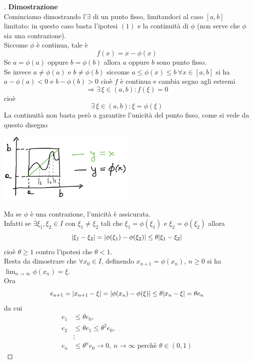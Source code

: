 \begin{proof}[\unskip\nopunct]
\textbf{Dimostrazione}\\
Cominciamo dimostrando l'$\exists$ di un punto fisso, limitandoci al caso $[a,b]$ limitato: in questo caso basta l'ipotesi $(1)$ e la continuità di $\phi$ (non serve che $\phi$ sia una contrazione). \\
Siccome $\phi$ è continua, tale è 
\[ f(x) = x - \phi(x) \]
Se $a = \phi(a)$ oppure $b = \phi(b)$ allora $a$ oppure $b$ sono punto fisso.\\
Se invece $a \neq \phi(a)$ e $b \neq \phi(b)$ siccome $a \leq \phi(x) \leq b \ \forall x \in [a,b]$ si ha $a - \phi(a) < 0$ e $b - \phi(b) > 0$ cioè $f$ è continua e cambia segno agli estremi 
\[\Longrightarrow \exists\, \xi \in (a,b):f(\xi)=0\] 
cioè \[\exists\, \xi \in (a,b) : \xi = \phi(\xi)\]
La continuità non basta però a garantire l'unicità del punto fisso, come si vede da questo disegno
\begin{center}
    \includegraphics[width=0.5\textwidth]{foto/img1_pag7}
\end{center}
Ma se $\phi$ è una contrazione, l'unicità è assicurata. \\
Infatti se $\exists \xi_1, \xi_2 \in I$ con $\xi_1 \neq \xi_2$ tali che $\xi_1 = \phi(\xi_1)$ e $\xi_2 = \phi(\xi_2)$ allora 
\[\lvert\xi_1 - \xi_2\rvert = \lvert\phi(\xi_1) - \phi(\xi_2)\rvert \leq \theta\lvert\xi_1 - \xi_2\rvert\] 
cioè $\theta \geq 1$ contro l'ipotesi che $\theta < 1$. \\
Resta da dimostrare che $\forall x_0 \in I$, definendo $x_{n+1} = \phi(x_n)$, $n \geq 0$ si ha $\lim_{n\to\infty} \phi(x_n) = \xi$. \\
Ora 
\[e_{n+1} = \lvert x_{n+1} - \xi\rvert = \lvert\phi(x_n) - \phi(\xi)\rvert \leq \theta\lvert x_n - \xi\rvert = \theta e_n\]
da cui 
\[\begin{split}
    e_1 & \leq \theta e_0,\\
    e_2 & \leq \theta e_1 \leq \theta^2 e_0, \\
    & \vdots \\
    e_n & \leq \theta^n e_0 \to 0, \ n\to\infty \text{ perchè } \theta \in (0,1)
\end{split}\]
\end{proof}

